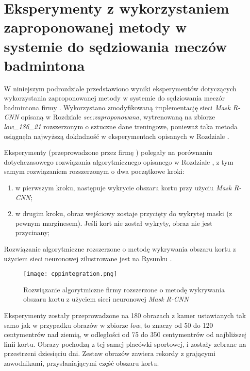 \section{Eksperymenty z wykorzystaniem zaproponowanej metody w systemie do sędziowania meczów badmintona}
\label{sec:integrationblue}

W niniejszym podrozdziale przedstawiono wyniki eksperymentów dotyczących wykorzystania zaproponowanej metody w systemie do sędziowania meczór badmintona firmy \blue{}.
Wykorzystano zmodyfikowaną implementację sieci \textit{Mask R-CNN} opisaną w Rozdziale \textit{sec:zaproponowana}, wytrenowaną na zbiorze \textit{low\_186\_21} rozszerzonym o sztuczne dane treningowe, ponieważ taka metoda osiągnęła najwyższą dokładność w eksperymentach opisanych w Rozdziale .

Eksperymenty (przeprowadzone przez firmę \blue{}) polegały na porównaniu dotychczasowego rozwiązania algorytmicznego opisanego w Rozdziale , z tym samym rozwiązaniem rozszerzonym o dwa początkowe kroki:

\begin{enumerate}
  \item w pierwszym kroku, następuje wykrycie obszaru kortu przy użyciu \textit{Mask R-CNN};
  \item w drugim kroku, obraz wejściowy zostaje przycięty do wykrytej maski (z pewnym marginesem). Jeśli kort nie został wykryty, obraz nie jest przycinany;
\end{enumerate}

Rozwiązanie algorytmiczne rozszerzone o metodę wykrywania obszaru kortu z użyciem sieci neuronowej zilustrowane jest na Rysunku .

\begin{figure}[h]
  \centering
  \texttt{[image: cppintegration.png]}
  \caption{Rozwiązanie algorytmiczne firmy \blue{} rozszerzone o metodę wykrywania obszaru kortu z użyciem sieci neuronowej \textit{Mask R-CNN}}
  \label{fig:cppintegration}
\end{figure}

Eksperymenty zostały przeprowadzone na 180 obrazach z kamer ustawianych tak samo jak w przypadku obrazów w zbiorze \textit{low}, to znaczy od 50 do 120 centymentrów nad ziemią, w odległości od 75 do 350 centymentrów od najbliższej linii kortu. Obrazy pochodzą z tej samej placówki sportowej, i zostały zebrane na przestrzeni dziesięciu dni. Zestaw obrazów zawiera rekordy z grającymi zawodnikami, przysłaniającymi część obszaru kortu.

